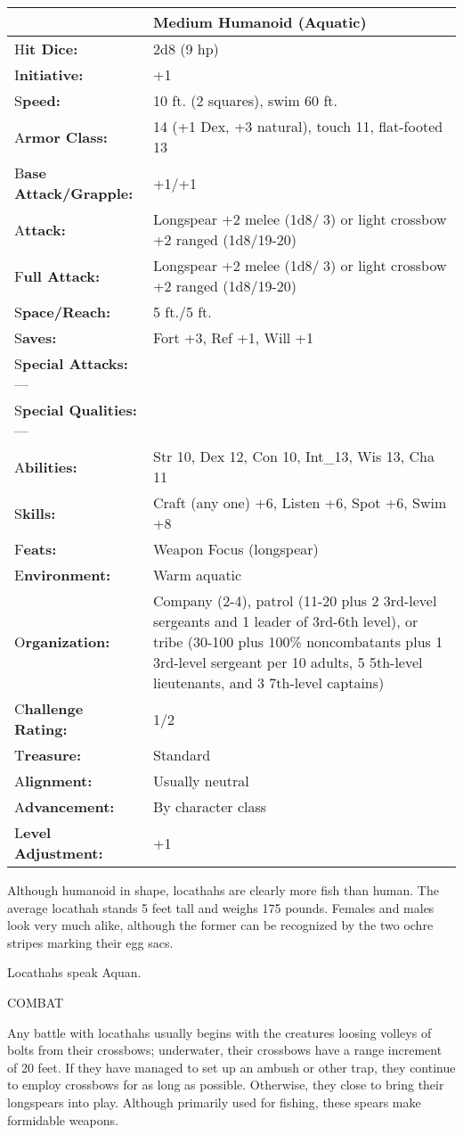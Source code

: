\documentclass{article}
\begin{document}
\begin{tabular}{|>{\raggedright}p{91pt}|>{\raggedright}p{208pt}|}
\hline
  & Medium Humanoid (Aquatic)\tabularnewline
\hline
H\textbf{it Dice:} & 2d8 (9 hp)\tabularnewline
\hline
I\textbf{nitiative:} & +1\tabularnewline
\hline
S\textbf{peed:} & 10 ft. (2 squares), swim 60 ft.\tabularnewline
\hline
A\textbf{rmor Class:} & 14 (+1 Dex, +3 natural), touch 11, flat-footed 13\tabularnewline
\hline
B\textbf{ase Attack/Grapple:} & +1/+1\tabularnewline
\hline
A\textbf{ttack:} & Longspear +2 melee (1d8/3) or light crossbow +2 ranged (1d8/19-20)\tabularnewline
\hline
F\textbf{ull Attack:} & Longspear +2 melee (1d8/3) or light crossbow +2 ranged 
(1d8/19-20)\tabularnewline
\hline
S\textbf{pace/Reach:} & 5 ft./5 ft.\tabularnewline
\hline
S\textbf{aves:} & Fort +3, Ref +1, Will +1\tabularnewline
\hline
S\textbf{pecial Attacks:}--- & \tabularnewline
\hline
S\textbf{pecial Qualities:}--- & \tabularnewline
\hline
A\textbf{bilities:} & Str 10, Dex 12, Con 10, Int\_13, Wis 13, Cha 11\tabularnewline
\hline
S\textbf{kills:} & Craft (any one) +6, Listen +6, Spot +6, Swim +8\tabularnewline
\hline
F\textbf{eats:} & Weapon Focus (longspear)\tabularnewline
\hline
E\textbf{nvironment:} & Warm aquatic\tabularnewline
\hline
O\textbf{rganization:} & Company (2-4), patrol (11-20 plus 2 3rd-level sergeants 
and 1 leader of 3rd-6th level), or tribe (30-100 plus 100\% noncombatants plus 
1 3rd-level sergeant per 10 adults, 5 5th-level lieutenants, and 3 7th-level captains)\tabularnewline
\hline
C\textbf{hallenge Rating:} & 1/2\tabularnewline
\hline
T\textbf{reasure:} & Standard\tabularnewline
\hline
A\textbf{lignment:} & Usually neutral\tabularnewline
\hline
A\textbf{dvancement:} & By character class\tabularnewline
\hline
L\textbf{evel Adjustment:} & +1\tabularnewline
\hline
\end{tabular}

Although humanoid in shape, locathahs are clearly more fish than human. The average 
locathah stands 5 feet tall and weighs 175 pounds. Females and males look very 
much alike, although the former can be recognized by the two ochre stripes marking 
their egg sacs.

Locathahs speak Aquan.

COMBAT

Any battle with locathahs usually begins with the creatures loosing volleys of 
bolts from their crossbows; underwater, their crossbows have a range increment 
of 20 feet. If they have managed to set up an ambush or other trap, they continue 
to employ crossbows for as long as possible. Otherwise, they close to bring their 
longspears into play. Although primarily used for fishing, these spears make formidable 
weapons.
\end{document}
